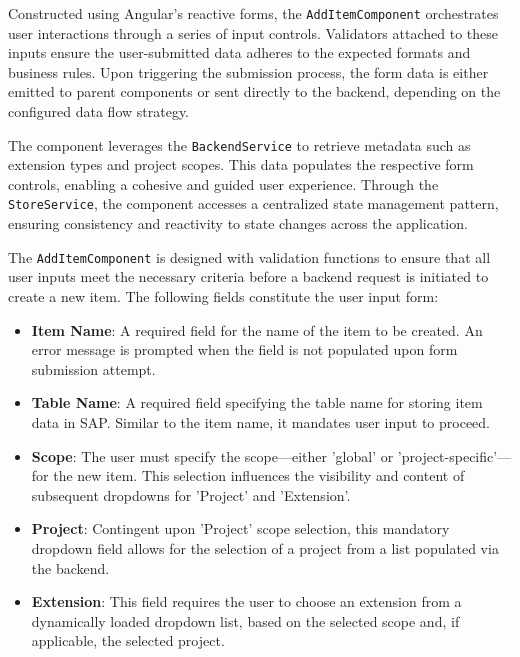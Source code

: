 Constructed using Angular's reactive forms, the \texttt{AddItemComponent} orchestrates user interactions through a series of input controls.
Validators attached to these inputs ensure the user-submitted data adheres to the expected formats and business rules.
Upon triggering the submission process, the form data is either emitted to parent components or sent directly to the backend, depending on the configured data flow strategy.

The component leverages the \texttt{BackendService} to retrieve metadata such as extension types and project scopes.
This data populates the respective form controls, enabling a cohesive and guided user experience.
Through the \texttt{StoreService}, the component accesses a centralized state management pattern, ensuring consistency and reactivity to state changes across the application.

The \texttt{AddItemComponent} is designed with validation functions to ensure that all user inputs meet the necessary criteria before a backend request is initiated to create a new item.
The following fields constitute the user input form:

\begin{itemize}
    \item \textbf{Item Name}: A required field for the name of the item to be created.
    An error message is prompted when the field is not populated upon form submission attempt.
    \item \textbf{Table Name}: A required field specifying the table name for storing item data in SAP. Similar to the item name, it mandates user input to proceed.
    \item \textbf{Scope}: The user must specify the scope—either 'global' or 'project-specific'—for the new item.
    This selection influences the visibility and content of subsequent dropdowns for 'Project' and 'Extension'.
    \item \textbf{Project}: Contingent upon 'Project' scope selection, this mandatory dropdown field allows for the selection of a project from a list populated via the backend.
    \item \textbf{Extension}: This field requires the user to choose an extension from a dynamically loaded dropdown list, based on the selected scope and, if applicable, the selected project.
\end{itemize}

